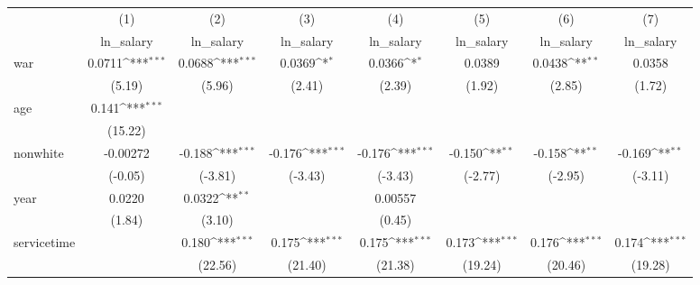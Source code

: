 {
\def\sym#1{\ifmmode^{#1}\else\(^{#1}\)\fi}
\begin{tabular}{l*{7}{c}}
\hline\hline
            &\multicolumn{1}{c}{(1)}&\multicolumn{1}{c}{(2)}&\multicolumn{1}{c}{(3)}&\multicolumn{1}{c}{(4)}&\multicolumn{1}{c}{(5)}&\multicolumn{1}{c}{(6)}&\multicolumn{1}{c}{(7)}\\
            &\multicolumn{1}{c}{ln\_salary}&\multicolumn{1}{c}{ln\_salary}&\multicolumn{1}{c}{ln\_salary}&\multicolumn{1}{c}{ln\_salary}&\multicolumn{1}{c}{ln\_salary}&\multicolumn{1}{c}{ln\_salary}&\multicolumn{1}{c}{ln\_salary}\\
\hline
war         &      0.0711\sym{***}&      0.0688\sym{***}&      0.0369\sym{*}  &      0.0366\sym{*}  &      0.0389         &      0.0438\sym{**} &      0.0358         \\
            &      (5.19)         &      (5.96)         &      (2.41)         &      (2.39)         &      (1.92)         &      (2.85)         &      (1.72)         \\
[1em]
age         &       0.141\sym{***}&                     &                     &                     &                     &                     &                     \\
            &     (15.22)         &                     &                     &                     &                     &                     &                     \\
[1em]
nonwhite    &    -0.00272         &      -0.188\sym{***}&      -0.176\sym{***}&      -0.176\sym{***}&      -0.150\sym{**} &      -0.158\sym{**} &      -0.169\sym{**} \\
            &     (-0.05)         &     (-3.81)         &     (-3.43)         &     (-3.43)         &     (-2.77)         &     (-2.95)         &     (-3.11)         \\
[1em]
year        &      0.0220         &      0.0322\sym{**} &                     &     0.00557         &                     &                     &                     \\
            &      (1.84)         &      (3.10)         &                     &      (0.45)         &                     &                     &                     \\
[1em]
servicetime &                     &       0.180\sym{***}&       0.175\sym{***}&       0.175\sym{***}&       0.173\sym{***}&       0.176\sym{***}&       0.174\sym{***}\\
            &                     &     (22.56)         &     (21.40)         &     (21.38)         &     (19.24)         &     (20.46)         &     (19.28)         \\

\end{tabular}}
